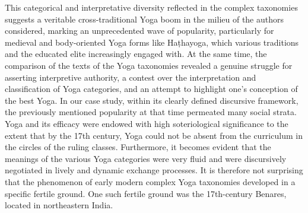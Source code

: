 This categorical and interpretative diversity reflected in the complex taxonomies suggests a veritable cross-traditional Yoga boom in the milieu of the authors considered, marking an unprecedented wave of popularity, particularly for medieval and body-oriented Yoga forms like Haṭhayoga, which various traditions and the educated elite increasingly engaged with. At the same time, the comparison of the texts of the Yoga taxonomies revealed a genuine struggle for asserting interpretive authority, a contest over the interpretation and classification of Yoga categories, and an attempt to highlight one's conception of the best Yoga.
In our case study, within its clearly defined discursive framework, the previously mentioned popularity at that time permeated many social strata. Yoga and its efficacy were endowed with high soteriological significance to the extent that by the 17th century, Yoga could not be absent from the curriculum in the circles of the ruling classes. Furthermore, it becomes evident that the meanings of the various Yoga categories were very fluid and were discursively negotiated in lively and dynamic exchange processes. It is therefore not surprising that the phenomenon of early modern complex Yoga taxonomies developed in a specific fertile ground. One such fertile ground was the 17th-century Benares, located in northeastern India.

